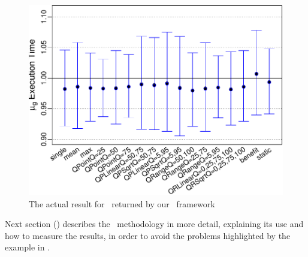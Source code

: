 \begin{figure}
  \centering
  \includegraphics[width=1.00\linewidth]{Figures/gcc-results}
  \caption{The actual result for \gcc\ returned by our \CP\ framework}
  \label{fig:gcc-results}
\end{figure}


Next section () describes the \CP\ methodology in more detail, explaining its use and how to measure the results, in order to avoid the problems highlighted by the example in .
